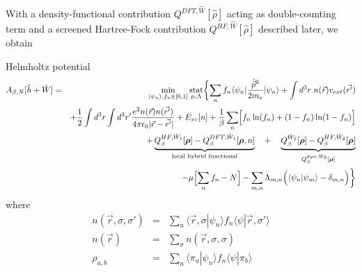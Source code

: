 \documentclass[11pt,a4paper]{report}
\begin{document}
With a density-functional contribution $Q^{DFT,\hat{W}}[\hat{\rho}]$
acting as double-counting term and a screened Hartree-Fock
contribution $Q^{HF,\hat{W}}[\hat{\rho}]$ described later, we obtain
\begin{myshadowminipage}{Helmholtz potential}
\begin{eqnarray}
A_{\beta,N}[\hat{h}+\hat{W}]
&=&\min_{|\psi_n\rangle,f_n\in[0,1]}\operatorname*{stat}_{\mu,\Lambda}
\biggl\lbrace
\sum_n f_n\langle\psi_n|\frac{\hat{\vec{p}}^2}{2m_e}|\psi_n\rangle
+\int d^3r\;n(\vec{r})v_{ext}(\vec{r'})
\nonumber\\
&&+\frac{1}{2}\int d^3r\int d^3r'
\frac{e^2n(\vec{r})n(\vec{r'})}{4\pi\epsilon_0|\vec{r}-\vec{r'}|}
+E_{xc}[n]
+\frac{1}{\beta}\sum_n\Bigl[f_n\ln(f_n)+(1-f_n)\ln(1-f_n)\Bigr]
\nonumber\\
&&+
\underbrace{Q_{\beta}^{HF,\hat{W}_1}[\bm{\rho}]
   -Q_{\beta}^{DFT,\hat{W}_1}[\bm{\rho},n]}_{\text{local hybrid functional}}
\quad+\quad
\underbrace{Q_{\beta}^{\hat{W}_2}[\bm{\rho}]
-Q_{\beta}^{HF,\hat{W}_2}[\bm{\rho}]}
_{Q_{\beta}^{dyn,\hat{W}_2}[\bm{\rho}]}
\nonumber\\
&&
-\mu\Bigl[\sum_n f_n-N\Bigr]
-\sum_{m,n}\Lambda_{m,n}\Bigl(\langle\psi_n|\psi_m\rangle-\delta_{m,n}\Bigr)
\biggr\rbrace
\label{eq:hp}
\end{eqnarray}
where 
\begin{eqnarray}
n(\vec{r},\sigma,\sigma')&=&
\sum_n\langle\vec{r},\sigma|\psi_n\rangle 
f_n\langle\psi|\vec{r},\sigma'\rangle 
\nonumber\\
n(\vec{r})&=&\sum_\sigma n(\vec{r},\sigma,\sigma)
\nonumber\\
\rho_{a,b}&=&\sum_n\langle\pi_a|\psi_n\rangle 
f_n\langle\psi|\pi_b\rangle 
\label{eq:denmatmatel}
\end{eqnarray}
\end{myshadowminipage}
\end{document}
